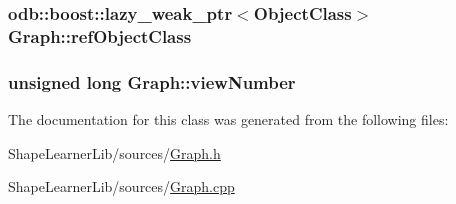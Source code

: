 \subsubsection[{ref\+Object\+Class}]{\setlength{\rightskip}{0pt plus 5cm}odb\+::boost\+::lazy\+\_\+weak\+\_\+ptr$<${\bf Object\+Class}$>$ Graph\+::ref\+Object\+Class\hspace{0.3cm}{\ttfamily [private]}}\label{class_graph_a415a23d3eba4de597a9ec6d84f521014}
\hypertarget{class_graph_a098aae7e26aa3fc9e49045eb50248a61}{}
\subsubsection[{view\+Number}]{\setlength{\rightskip}{0pt plus 5cm}unsigned long Graph\+::view\+Number\hspace{0.3cm}{\ttfamily [private]}}\label{class_graph_a098aae7e26aa3fc9e49045eb50248a61}


The documentation for this class was generated from the following files\+:\begin{DoxyCompactItemize}
\item 
Shape\+Learner\+Lib/sources/\hyperlink{_graph_8h}{Graph.\+h}\item 
Shape\+Learner\+Lib/sources/\hyperlink{_graph_8cpp}{Graph.\+cpp}\end{DoxyCompactItemize}
